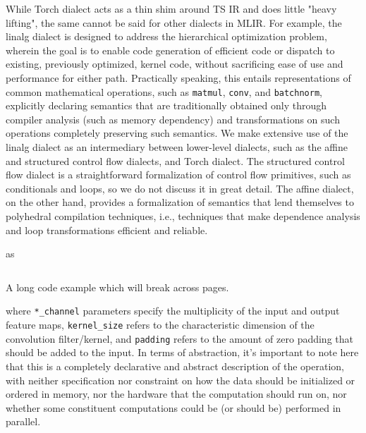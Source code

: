 While Torch dialect acts as a thin shim around TS IR and does little "heavy lifting", the same cannot be said for other dialects in MLIR.
For example, the linalg dialect is designed to address the hierarchical optimization problem, wherein the goal is to enable code generation of efficient code or dispatch to existing, previously optimized, kernel code, without sacrificing ease of use and performance for either path.
Practically speaking, this entails representations of common mathematical operations, such as \texttt{matmul}, \texttt{conv}, and \texttt{batchnorm}, explicitly declaring semantics that are traditionally obtained only through compiler analysis (such as memory dependency) and transformations on such operations completely preserving such semantics.
We make extensive use of the linalg dialect as an intermediary between lower-level dialects, such as the affine and structured control flow dialects, and Torch dialect.
The structured control flow dialect is a straightforward formalization of control flow primitives, such as conditionals and loops, so we do not discuss it in great detail.
The affine dialect, on the other hand, provides a formalization of semantics that lend themselves to polyhedral compilation techniques\cite{polyhedral-mlir}, i.e., techniques that make dependence analysis and loop transformations efficient and reliable.

 as
\begin{longlisting}
	\inputminted{python}{sources/conv2d.py}
	\caption[Long Code Example]{A long code example which will break across pages.}
	\label{lst:long}
\end{longlisting}
\noindent where \texttt{*_channel} parameters specify the multiplicity of the input and output feature maps, \texttt{kernel_size} refers to the characteristic dimension of the convolution filter/kernel, and \texttt{padding} refers to the amount of zero padding that should be added to the input.
In terms of abstraction, it's important to note here that this is a completely declarative and abstract description of the operation, with neither specification nor constraint on how the data should be initialized or ordered in memory, nor the hardware that the computation should run on, nor whether some constituent computations could be (or should be) performed in parallel.

